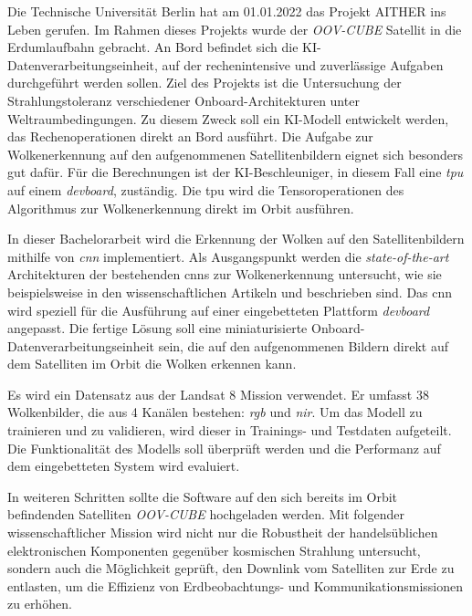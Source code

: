 {

\setlength{\parindent}{0pt}
\setlength{\parskip}{1em}


Die Technische Universität Berlin hat am 01.01.2022 das Projekt AITHER ins Leben gerufen.
Im Rahmen dieses Projekts wurde der \textit{OOV-CUBE} Satellit in die Erdumlaufbahn gebracht.
An Bord befindet sich die KI-Daten\-ver\-ar\-bei\-tungs\-ein\-heit, auf der rechenintensive und zuverlässige Aufgaben durchgeführt werden sollen.
Ziel des Projekts ist die Untersuchung der Strahlungstoleranz verschiedener Onboard-Architekturen unter Welt\-raum\-be\-ding\-un\-gen.
Zu diesem Zweck soll ein KI-Modell entwickelt werden, das Rechenoperationen direkt an Bord ausführt.
Die Aufgabe zur Wolkenerkennung auf den aufgenommenen Satellitenbildern eignet sich besonders gut dafür.
Für die Berechnungen ist der KI-Beschleuniger,
in diesem Fall eine \textit{\gls{tpu}} auf einem \textit{\gls{devboard}}, zuständig.
Die \gls{tpu} wird die Tensoroperationen des Algorithmus zur Wolkenerkennung direkt im Orbit ausführen.

In dieser Bachelorarbeit wird die Erkennung der Wolken auf den Satellitenbildern mithilfe von \textit{\gls{cnn}} implementiert.
Als Ausgangspunkt werden die \textit{state-of-the-art} Architekturen der bestehenden \glspl{cnn} zur Wolkenerkennung untersucht,
wie sie beispielsweise in den wissenschaftlichen Artikeln \cite{CloudNet2019} und \cite{CloudDet2018} beschrieben sind.
Das \gls{cnn} wird speziell für die Ausführung auf einer eingebetteten Plattform \textit{\gls{devboard}} angepasst.
Die fertige Lösung soll eine miniaturisierte Onboard-Da\-ten\-ver\-ar\-bei\-tungs\-ein\-heit sein,
die auf den aufgenommenen Bildern direkt auf dem Satelliten im Orbit die Wolken erkennen kann.

Es wird ein Datensatz aus der Landsat 8 Mission verwendet.
Er umfasst 38 Wolkenbilder, die aus 4 Kanälen bestehen: \textit{\gls{rgb}} und \textit{\gls{nir}}.
Um das Modell zu trainieren und zu validieren, wird dieser in Trainings- und Testdaten aufgeteilt.
Die Funktionalität des Modells soll überprüft werden und die Performanz auf dem eingebetteten System wird evaluiert. 

In weiteren Schritten sollte die Software auf den sich bereits im Orbit befindenden Satelliten \textit{OOV-CUBE} hochgeladen werden.
Mit folgender wissenschaftlicher Mission wird nicht nur die Robustheit der handelsüblichen elektronischen Komponenten gegenüber
kosmischen Strahlung untersucht, sondern auch die Möglichkeit geprüft, den Downlink vom Satelliten zur Erde zu entlasten,
um die Effizienz von Erdbeobachtungs- und Kommunikationsmissionen zu erhöhen.


}
